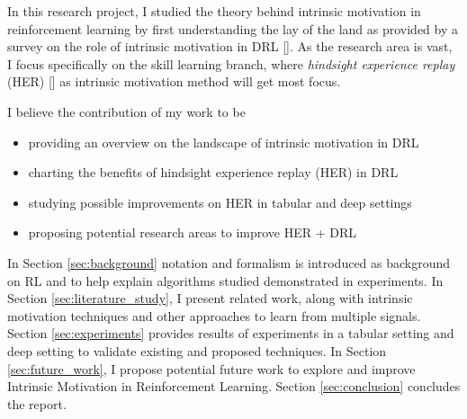 \documentclass[conference]{IEEEtran}
\begin{document}
In this research project, I studied the theory behind intrinsic motivation in reinforcement learning by first understanding the lay of the land as provided by a survey on the role of intrinsic motivation in DRL [\cite{aubret2019survey}]. As the research area is vast, I focus specifically on the skill learning branch, where \textit{hindsight experience replay} (HER) [\cite{andrychowicz2017hindsight}] as intrinsic motivation method will get most focus.

I believe the contribution of my work to be
\begin{itemize}
    \item providing an overview on the landscape of intrinsic motivation in DRL
    \item charting the benefits of hindsight experience replay (HER) in DRL
    \item studying possible improvements on HER in tabular and deep settings
    \item proposing potential research areas to improve HER + DRL
\end{itemize}{}

In Section \ref{sec:background} notation and formalism is introduced as background on RL and to help explain algorithms studied demonstrated in experiments. In Section \ref{sec:literature_study}, I present related work, along with intrinsic motivation techniques and other approaches to learn from multiple signals. Section \ref{sec:experiments} provides results of experiments in a tabular setting and deep setting to validate existing and proposed techniques. In Section \ref{sec:future_work}, I propose potential future work to explore and improve Intrinsic Motivation in Reinforcement Learning. Section \ref{sec:conclusion} concludes the report.
\end{document}
